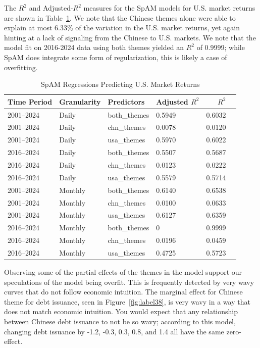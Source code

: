 The $R^2$ and Adjusted-$R^2$ measures for the SpAM models for U.S. market returns are shown in Table~\ref{tab:spam_usa_market}. We note that the Chinese themes alone were able to explain at most 6.33\% of the variation in the U.S. market returns, yet again hinting at a lack of signaling from the Chinese to U.S. markets. We note that the model fit on 2016-2024 data using both themes yielded an $R^2$ of 0.9999; while SpAM does integrate some form of regularization, this is likely a case of overfitting. 


\begin{table}[htbp]
\centering
\caption{SpAM Regressions Predicting U.S. Market Returns}
\label{tab:spam_usa_market}
\begin{tabular}{@{}llllrr@{}}
\toprule
Time Period & Granularity & Predictors     & Adjusted $R^2$ & $R^2$ \\ \midrule
2001--2024  & Daily       & both\_themes   & 0.5949          & 0.6032 \\
2001--2024  & Daily       & chn\_themes    & 0.0078          & 0.0120 \\
2001--2024  & Daily       & usa\_themes    & 0.5970          & 0.6022 \\
2016--2024  & Daily       & both\_themes   & 0.5507          & 0.5687 \\
2016--2024  & Daily       & chn\_themes    & 0.0123          & 0.0222 \\
2016--2024  & Daily       & usa\_themes    & 0.5579          & 0.5714 \\
2001--2024  & Monthly     & both\_themes   & 0.6140          & 0.6538 \\
2001--2024  & Monthly     & chn\_themes    & 0.0100          & 0.0633 \\
2001--2024  & Monthly     & usa\_themes    & 0.6127          & 0.6359 \\
2016--2024  & Monthly     & both\_themes   & 0          & 0.9999 \\
2016--2024  & Monthly     & chn\_themes    & 0.0196          & 0.0459 \\
2016--2024  & Monthly     & usa\_themes    & 0.4725          & 0.5723 \\ \bottomrule
\end{tabular}
\end{table}

Observing some of the partial effects of the themes in the model support our speculations of the model being overfit. This is frequently detected by very wavy curves that do not follow economic intuition. The marginal effect for Chinese theme for debt issuance, seen in Figure~\ref{fig:label38}, is very wavy in a way that does not match economic intuition. You would expect that any relationship between Chinese debt issuance to not be so wavy; according to this model, changing debt issuance by -1.2, -0.3, 0.3, 0.8, and 1.4 all have the same zero-effect.

